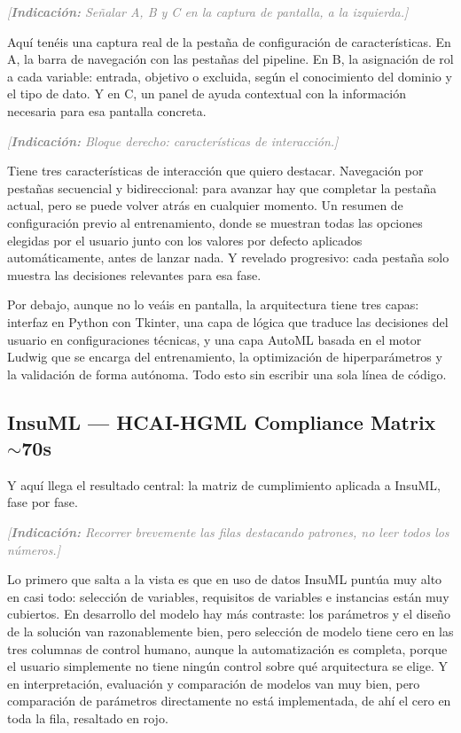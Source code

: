 \documentclass[11pt,a4paper]{article}
\newcommand{\indicacion}[1]{%
    \par\medskip
    \noindent\textcolor{gray}{\textit{[\textbf{Indicaci\'on:} #1]}}
    \par\medskip
}
\begin{document}
\indicacion{Señalar A, B y C en la captura de pantalla, a la izquierda.}
Aquí tenéis una captura real de la pestaña de configuración de características. En A, la barra de navegación con las pestañas del pipeline. En B, la asignación de rol a cada variable: entrada, objetivo o excluida, según el conocimiento del dominio y el tipo de dato. Y en C, un panel de ayuda contextual con la información necesaria para esa pantalla concreta.

\indicacion{Bloque derecho: características de interacción.}
Tiene tres características de interacción que quiero destacar. Navegación por pestañas secuencial y bidireccional: para avanzar hay que completar la pestaña actual, pero se puede volver atrás en cualquier momento. Un resumen de configuración previo al entrenamiento, donde se muestran todas las opciones elegidas por el usuario junto con los valores por defecto aplicados automáticamente, antes de lanzar nada. Y revelado progresivo: cada pestaña solo muestra las decisiones relevantes para esa fase.

Por debajo, aunque no lo veáis en pantalla, la arquitectura tiene tres capas: interfaz en Python con Tkinter, una capa de lógica que traduce las decisiones del usuario en configuraciones técnicas, y una capa AutoML basada en el motor Ludwig que se encarga del entrenamiento, la optimización de hiperparámetros y la validación de forma autónoma. Todo esto sin escribir una sola línea de código.

\subsection{InsuML --- HCAI-HGML Compliance Matrix \hfill \normalfont\small $\sim$70s}
Y aquí llega el resultado central: la matriz de cumplimiento aplicada a InsuML, fase por fase.

\indicacion{Recorrer brevemente las filas destacando patrones, no leer todos los números.}
Lo primero que salta a la vista es que en uso de datos InsuML puntúa muy alto en casi todo: selección de variables, requisitos de variables e instancias están muy cubiertos. En desarrollo del modelo hay más contraste: los parámetros y el diseño de la solución van razonablemente bien, pero selección de modelo tiene cero en las tres columnas de control humano, aunque la automatización es completa, porque el usuario simplemente no tiene ningún control sobre qué arquitectura se elige. Y en interpretación, evaluación y comparación de modelos van muy bien, pero comparación de parámetros directamente no está implementada, de ahí el cero en toda la fila, resaltado en rojo.
\end{document}
